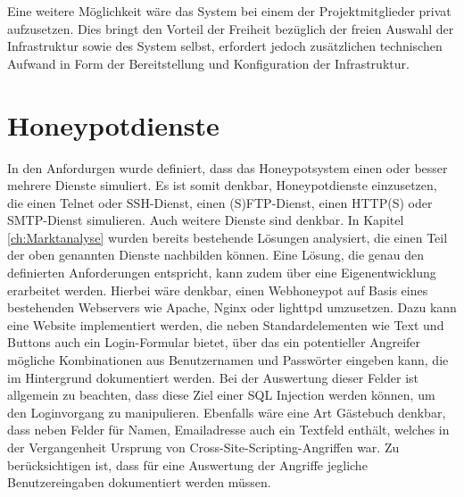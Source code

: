 Eine weitere Möglichkeit wäre das System bei einem der Projektmitglieder privat aufzusetzen. Dies bringt den Vorteil der Freiheit bezüglich der freien Auswahl der Infrastruktur sowie des System selbst, erfordert jedoch zusätzlichen technischen Aufwand in Form der Bereitstellung und Konfiguration der Infrastruktur.\\


\section{Honeypotdienste}
\label{sec:Honeypotdienste}


In den Anfordurgen wurde definiert, dass das Honeypotsystem einen oder besser mehrere Dienste simuliert.  Es ist somit denkbar, Honeypotdienste einzusetzen, die einen Telnet oder SSH-Dienst, einen (S)FTP-Dienst, einen HTTP(S) oder SMTP-Dienst simulieren. Auch weitere Dienste sind denkbar. In Kapitel \ref{ch:Marktanalyse} wurden bereits bestehende Lösungen analysiert, die einen Teil der oben genannten Dienste nachbilden können.
Eine Lösung, die genau den definierten Anforderungen entspricht, kann zudem über eine Eigenentwicklung erarbeitet werden. Hierbei wäre denkbar, einen Webhoneypot auf Basis eines bestehenden Webservers wie Apache, Nginx oder lighttpd umzusetzen. Dazu kann eine Website implementiert werden, die neben Standardelementen wie Text und Buttons auch ein Login-Formular bietet, über das ein potentieller Angreifer mögliche Kombinationen aus Benutzernamen und Passwörter eingeben kann, die im Hintergrund dokumentiert werden. Bei der Auswertung dieser Felder ist allgemein zu beachten, dass diese Ziel einer SQL Injection werden können, um den Loginvorgang zu manipulieren. Ebenfalls wäre eine Art Gästebuch denkbar, dass neben Felder für Namen, Emailadresse auch ein Textfeld enthält, welches in der Vergangenheit Ursprung von Cross-Site-Scripting-Angriffen war. Zu berücksichtigen ist, dass für eine Auswertung der Angriffe jegliche Benutzereingaben dokumentiert werden müssen.







